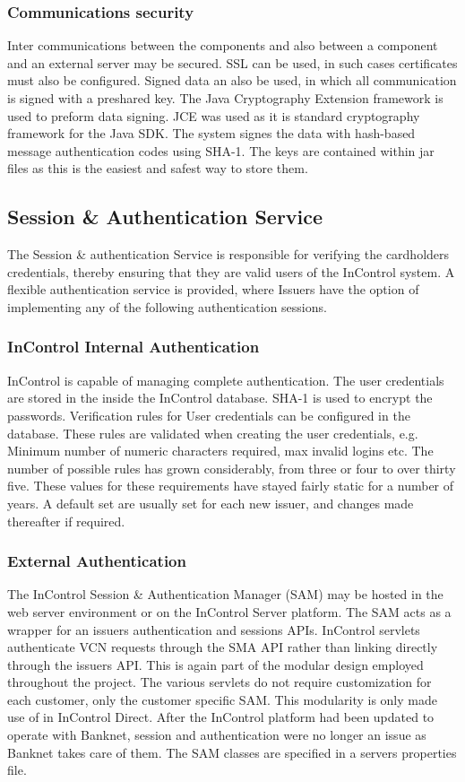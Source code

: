 \documentclass[a4paper,12pt, titlepage]{article}
\begin{document}
\subsubsection{Communications security}
Inter communications between the components and also between a component and an external server may be secured. SSL can be used, in such cases certificates must also be configured. Signed data an also be used, in which all communication is signed with a preshared key. The Java Cryptography Extension framework is used to preform data signing. JCE was used as it is standard cryptography framework for the Java SDK. The system signes the data with hash-based message authentication codes using SHA-1. The keys are contained within jar files as this is the easiest and safest way to store them.

\subsection{Session \& Authentication Service}
The Session \& authentication Service is responsible for verifying the cardholders credentials, thereby ensuring that they are valid users of the InControl system.
A flexible authentication service is provided, where Issuers have the option of implementing any of the following authentication sessions.

\subsubsection{InControl Internal Authentication}
InControl is capable of managing complete authentication. The user credentials are stored in the inside the InControl database. SHA-1 is used to encrypt the passwords.
Verification rules for User credentials can be configured in the database. These rules are validated when creating the user credentials, e.g. Minimum number of numeric characters required, max invalid logins etc. The number of possible rules has grown considerably, from three or four to over thirty five. These values for these requirements have stayed fairly static for a number of years. A default set are usually set for each new issuer, and changes made thereafter if required. 

\subsubsection{External Authentication}
The InControl Session \& Authentication Manager (SAM) may be hosted in the web server environment or on the InControl Server platform. The SAM acts as a wrapper for an issuers authentication and sessions APIs. InControl servlets authenticate VCN requests through the SMA API rather than linking directly through the issuers API. This is again part of the modular design employed throughout the project. The various servlets do not require customization for each customer, only the customer specific SAM. This modularity is only made use of in InControl Direct. After the InControl platform had been updated to operate with Banknet, session and authentication were no longer an issue as Banknet takes care of them.
The SAM classes are specified in a servers properties file.
\end{document}
